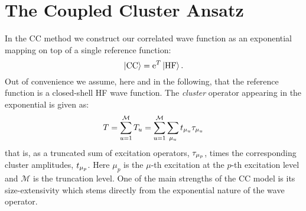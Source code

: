 \section{The Coupled Cluster Ansatz}\label{sec:coupled-cluster}

In the \acrlong*{CC} method we construct our correlated wave function as
an exponential mapping on top of a single reference
function:\autocite{Crawford2000-ey, Helgaker2000-tz, Bartlett2007-mz,
Shavitt2009-mr}
\begin{equation}
  \label{eq:cluster}
  \ket{\mathrm{CC}} = \mathrm{e}^{T}\ket{\mathrm{HF}}.
\end{equation}
Out of convenience we assume, here and in the following, that the
reference function is a closed-shell \acrshort{HF} wave function.
The \emph{cluster} operator appearing in the exponential is given as:
\begin{equation}
  T = \sum_{u=1}^\mathcal{M} T_u = \sum_{u=1}^\mathcal{M}\sum_{\mu_u}t_{\mu_u}\tau_{\mu_u}
\end{equation}
that is, as a truncated sum of excitation operators, $\tau_{\mu_p}$,
times the corresponding cluster amplitudes, $t_{\mu_p}$.
Here $\mu_p$ is the $\mu$-th excitation at the $p$-th excitation level and
$\mathcal{M}$ is the truncation level.
One of the main strengths of the \acrshort{CC} model is its size-extensivity
which stems directly from the exponential nature of the wave
operator.\autocite{Shavitt2009-mr, Helgaker2000-tz}

